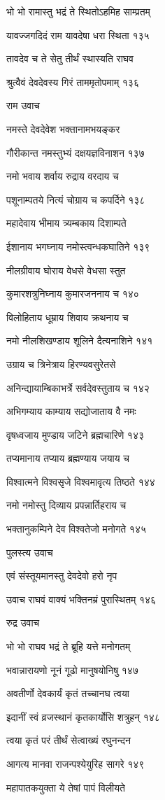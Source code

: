 भो भो रामास्तु भद्रं ते स्थितोऽहमिह साम्प्रतम्

यावज्जगदिदं राम यावदेषा धरा स्थिता १३५

तावदेव च ते सेतु तीर्थं स्थास्यति राघव

श्रुत्वैवं देवदेवस्य गिरं ताममृतोपमाम् १३६

राम उवाच

नमस्ते देवदेवेश भक्तानामभयङ्कर

गौरीकान्त नमस्तुभ्यं दक्षयज्ञविनाशन १३७

नमो भवाय शर्वाय रुद्राय वरदाय च

पशूनाम्पतये नित्यं चोग्राय च कपर्दिने १३८

महादेवाय भीमाय त्र्यम्बकाय दिशाम्पते

ईशानाय भगघ्नाय नमोस्त्वन्धकघातिने १३९

नीलग्रीवाय घोराय वेधसे वेधसा स्तुत

कुमारशत्रुनिघ्नाय कुमारजननाय च १४०

विलोहिताय धूम्राय शिवाय क्रथनाय च

नमो नीलशिखण्डाय शूलिने दैत्यनाशिने १४१

उग्राय च त्रिनेत्राय हिरण्यवसुरेतसे

अनिन्द्यायाम्बिकाभर्त्रे सर्वदेवस्तुताय च १४२

अभिगम्याय काम्याय सद्योजाताय वै नमः

वृषध्वजाय मुण्डाय जटिने ब्रह्मचारिणे १४३

तप्यमानाय तप्याय ब्रह्मण्याय जयाय च

विश्वात्मने विश्वसृजे विश्वमावृत्य तिष्ठते १४४

नमो नमोस्तु दिव्याय प्रपन्नार्तिहराय च

भक्तानुकम्पिने देव विश्वतेजो मनोगते १४५

पुलस्त्य उवाच

एवं संस्तूयमानस्तु देवदेवो हरो नृप

उवाच राघवं वाक्यं भक्तिनम्रं पुरास्थितम् १४६

रुद्र उवाच

भो भो राघव भद्रं ते ब्रूहि यत्ते मनोगतम्

भवान्नारायणो नूनं गूढो मानुषयोनिषु १४७

अवतीर्णो देवकार्यं कृतं तच्चानघ त्वया

इदानीं स्वं व्रजस्थानं कृतकार्योसि शत्रुहन् १४८

त्वया कृतं परं तीर्थं सेत्वाख्यं रघुनन्दन

आगत्य मानवा राजन्पश्येयुरिह सागरे १४९

महापातकयुक्ता ये तेषां पापं विलीयते

